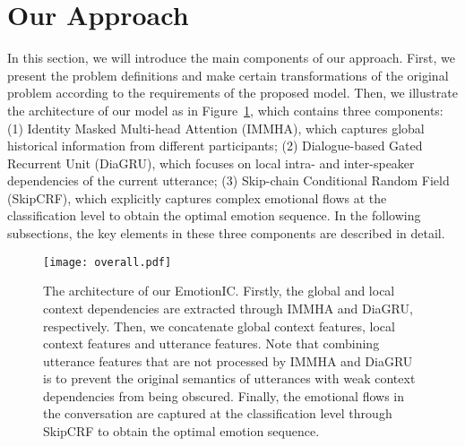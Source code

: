 \documentclass{SCIS2019}
\begin{document}
\section{Our Approach}\label{sec:our_approach}
In this section, we will introduce the main components of our approach. First, we present the problem definitions and make certain transformations of the original problem according to the requirements of the proposed model. Then, we illustrate the architecture of our model as in Figure~\ref{fig:overall}, which contains three components: (1) Identity Masked Multi-head Attention (IMMHA), which captures global historical information from different participants; (2) Dialogue-based Gated Recurrent Unit (DiaGRU), which focuses on local intra- and inter-speaker dependencies of the current utterance; (3) Skip-chain Conditional Random Field (SkipCRF), which explicitly captures complex emotional flows at the classification level to obtain the optimal emotion sequence. In the following subsections, the key elements in these three components are described in detail.
\begin{figure}[htbp]
	\centering
	\texttt{[image: overall.pdf]}
	\caption{The architecture of our EmotionIC. Firstly, the global and local context dependencies are extracted through IMMHA and DiaGRU, respectively. Then, we concatenate global context features, local context features and utterance features. Note that combining utterance features that are not processed by IMMHA and DiaGRU is to prevent the original semantics of utterances with weak context dependencies from being obscured. Finally, the emotional flows in the conversation are captured at the classification level through SkipCRF to obtain the optimal emotion sequence.}
	\label{fig:overall}
\end{figure}
\end{document}
